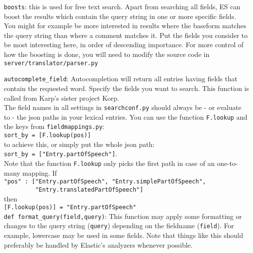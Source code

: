 \documentclass[
12pt, %
a4paper, %
oneside, %
headinclude,footinclude, %
BCOR0mm, %
]{scrartcl}
\begin{document}
  \verb|boosts|: this is used for free text search. Apart from
          searching all fields, ES can boost the results which contain the query
          string in one or more specific fields. You might for example be more interested in
          results where the baseform matches the query string than where a comment
          matches it. Put the fields you consider to be most interesting here, in order of
          descending importance. For more control of how the boosting is done, you will need
          to modify the source code in \verb|server/translator/parser.py|

  \verb|autocomplete_field|: Autocompletion will return all entries having fields that contain the
          requested word. Specify the fields you want to search.
          This function is called from Karp's sister project Korp.
          \\

          The field names in all settings in \verb|searchconf.py| should always
          be - or evaluate to - the json paths in your lexical entries.
          You can use the function
          \verb|F.lookup| and the keys from \verb|fieldmappings.py|:\\
          \verb|sort_by = [F.lookup(pos)]| \\
          to achieve this, or simply put the whole json path: \\
          \verb|sort_by = ["Entry.partOfSpeech"]|.\\
          Note that the function \verb|F.lookup| only picks the first path in case of
          an one-to-many mapping. If \\
          {\verb|"pos" : ["Entry.partOfSpeech", "Entry.simplePartOfSpeech",|\\}
          {\verb|         "Entry.translatedPartOfSpeech"]|\\}
          then\\
          \verb|[F.lookup(pos)] = "Entry.partOfSpeech"| \\

  \verb|def format_query(field,query)|: This function may apply some formatting or changes
          to the query string (\verb|query|) depending on the fieldname (\verb|field|).
          For example, lowercase may be used in some fields. Note that things like this
          should preferably be handled by Elastic's analyzers whenever possible.
\end{document}
